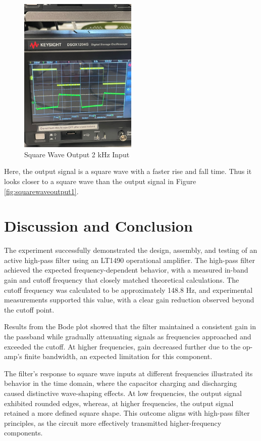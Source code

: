 \documentclass[12pt]{article}
\begin{document}
\begin{figure}[H]
  \centering
  \includegraphics[width=0.5\textwidth]{photos/Oscilloscope 3.jpg}
  \caption{Square Wave Output 2 kHz Input}
  \label{fig:squarewaveoutput2}
\end{figure}

Here, the output signal is a square wave with a faster rise
and fall time. Thus it looks closer to a square wave than the
output signal in Figure \ref{fig:squarewaveoutput1}.

\section{Discussion and Conclusion}
The experiment successfully demonstrated the design, assembly, and testing of an
active high-pass filter using an LT1490 operational amplifier. The high-pass
filter achieved the expected frequency-dependent behavior, with a measured
in-band gain and cutoff frequency that closely matched theoretical calculations.
The cutoff frequency was calculated to be approximately 148.8 Hz, and
experimental measurements supported this value, with a clear gain reduction
observed beyond the cutoff point.
\newline

Results from the Bode plot showed that the filter maintained a consistent gain
in the passband while gradually attenuating signals as frequencies approached
and exceeded the cutoff. At higher frequencies, gain decreased further due to
the op-amp's finite bandwidth, an expected limitation for this component.
\newline

The filter's response to square wave inputs at different frequencies
illustrated its behavior in the time domain, where the capacitor charging and
discharging caused distinctive wave-shaping effects. At low frequencies, the
output signal exhibited rounded edges, whereas, at higher frequencies, the
output signal retained a more defined square shape. This outcome aligns with
high-pass filter principles, as the circuit more effectively transmitted
higher-frequency components.
\newline
\end{document}
